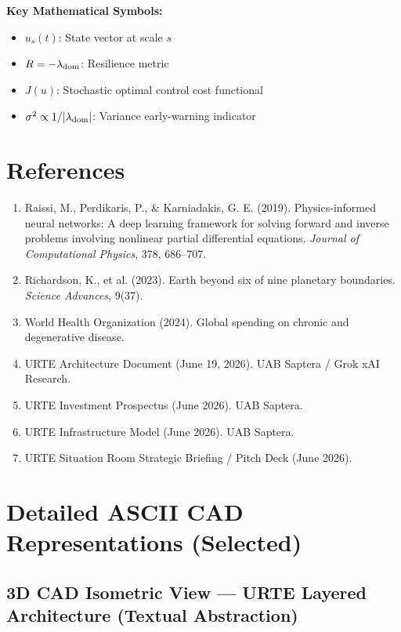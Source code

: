 \documentclass[11pt,a4paper]{report}
\begin{document}
\vspace{0.5cm}
\textbf{Key Mathematical Symbols:}
\begin{itemize}
    \item $u_s(t)$: State vector at scale $s$
    \item $R = -\lambda_{\rm dom}$: Resilience metric
    \item $J(u)$: Stochastic optimal control cost functional
    \item $\sigma^2 \propto 1/|\lambda_{\rm dom}|$: Variance early-warning indicator
\end{itemize}

\chapter{References}

\begin{enumerate}
    \item Raissi, M., Perdikaris, P., \& Karniadakis, G. E. (2019). Physics-informed neural networks: A deep learning framework for solving forward and inverse problems involving nonlinear partial differential equations. \textit{Journal of Computational Physics}, 378, 686--707.
    \item Richardson, K., et al. (2023). Earth beyond six of nine planetary boundaries. \textit{Science Advances}, 9(37).
    \item World Health Organization (2024). Global spending on chronic and degenerative disease.
    \item URTE Architecture Document (June 19, 2026). UAB Saptera / Grok xAI Research.
    \item URTE Investment Prospectus (June 2026). UAB Saptera.
    \item URTE Infrastructure Model (June 2026). UAB Saptera.
    \item URTE Situation Room Strategic Briefing / Pitch Deck (June 2026).
\end{enumerate}

\chapter{Detailed ASCII CAD Representations (Selected)}

\section{3D CAD Isometric View --- URTE Layered Architecture (Textual Abstraction)}
\end{document}
